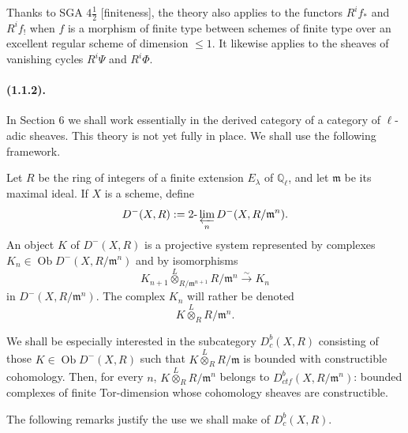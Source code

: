 \documentclass[11pt]{article}
\theoremstyle{remark}
\newcommand{\Ql}{\mathbb{Q}_\ell}
\newcommand{\Ob}{\operatorname{Ob}}
\newcommand{\limproj}{\varprojlim}
\begin{document}
Thanks to SGA $4\frac12$ [finiteness], the theory also applies to the functors $R^if_*$ and $R^if_!$ when $f$ is a morphism of finite type between schemes of finite type over an excellent regular scheme of dimension $\le1$. It likewise applies to the sheaves of vanishing cycles $R^i\Psi$ and $R^i\Phi$.

\paragraph{(1.1.2).} In Section 6 we shall work essentially in the derived category of a category of $\ell$-adic sheaves. This theory is not yet fully in place. We shall use the following framework.

Let $R$ be the ring of integers of a finite extension $E_\lambda$ of $\Ql$, and let $\mathfrak m$ be its maximal ideal. If $X$ is a scheme, define
\[
D^-(X,R):=2\text{-}\limproj_n D^-(X,R/\mathfrak m^n).
\]
An object $K$ of $D^-(X,R)$ is a projective system represented by complexes $K_n\in\Ob D^-(X,R/\mathfrak m^n)$ and by isomorphisms
\[
K_{n+1}\overset L\otimes_{R/\mathfrak m^{n+1}} R/\mathfrak m^n \xrightarrow{\sim} K_n
\]
in $D^-(X,R/\mathfrak m^n)$. The complex $K_n$ will rather be denoted
\[
K\overset L\otimes_R R/\mathfrak m^n.
\]

We shall be especially interested in the subcategory $D^b_c(X,R)$ consisting of those $K\in\Ob D^-(X,R)$ such that $K\overset L\otimes_R R/\mathfrak m$ is bounded with constructible cohomology. Then, for every $n$, $K\overset L\otimes_R R/\mathfrak m^n$ belongs to $D^b_{ctf}(X,R/\mathfrak m^n)$: bounded complexes of finite Tor-dimension whose cohomology sheaves are constructible.

The following remarks justify the use we shall make of $D^b_c(X,R)$.
\end{document}
